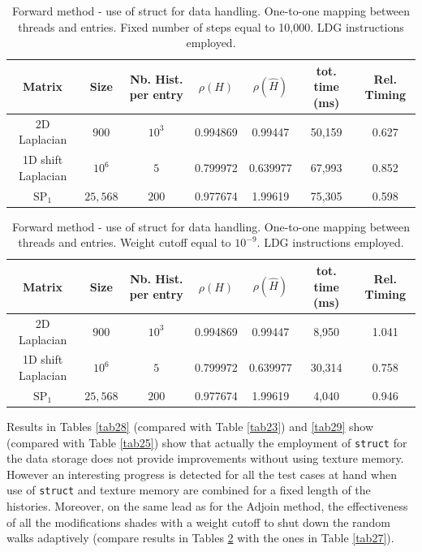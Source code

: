 \documentclass[a4paper,10pt]{article}
\begin{document}
\begin{table}[!h]
\hspace*{-1cm}
\begin{tabular}{|c|c|c|c|c|c|c|}
\hline
\textbf{Matrix} & \textbf{Size} &\textbf{Nb. Hist. per entry} & $\rho(H)$ 
& $\rho(\hat{H})$ & tot. time (ms) & Rel. Timing\\
\hline
2D Laplacian& $900$ & $10^3$ & 0.994869 & 0.99447 & 50,159 & 0.627\\
\hline 
1D shift Laplacian& $10^6$ & $5$ & 0.799972 & 0.639977 & 67,993 & 0.852\\
\hline
$\text{SP}_1$ & $25,568$ & $200$ & 0.977674 & 1.99619 & 75,305 & 0.598\\
\hline
\end{tabular}
\caption{Forward method - use of struct for data handling. One-to-one mapping 
between threads and entries. 
Fixed number of steps equal to 10,000. LDG instructions employed.}
\label{tab30}
\end{table}


\begin{table}[!h]
\hspace*{-1cm}
\begin{tabular}{|c|c|c|c|c|c|c|}
\hline
\textbf{Matrix} & \textbf{Size} &\textbf{Nb. Hist. per entry} & $\rho(H)$ 
& $\rho(\hat{H})$ & tot. time (ms) & Rel. Timing\\
\hline
2D Laplacian& $900$ & $10^3$ & 0.994869 & 0.99447 & 8,950 & 1.041\\
\hline 
1D shift Laplacian& $10^6$ & $5$ & 0.799972 & 0.639977 & 30,314 & 0.758\\
\hline
$\text{SP}_1$ & $25,568$ & $200$ & 0.977674 & 1.99619 & 4,040 & 0.946\\
\hline
\end{tabular}
\caption{Forward method - use of struct for data handling. One-to-one mapping 
between threads and entries. 
Weight cutoff equal to $10^{-9}$. LDG instructions employed.}
\label{tab31}
\end{table}

Results in Tables \ref{tab28} (compared with Table \ref{tab23}) and \ref{tab29} 
show (compared with Table \ref{tab25}) show
that actually the employment of \texttt{struct} for the data storage does not 
provide 
improvements without using texture memory. However an 
interesting progress is detected for all the test cases at hand when use of 
\texttt{struct} and texture memory are combined for a fixed length of the 
histories. Moreover, on the same lead as for the Adjoin method, the 
effectiveness of all the modifications shades with a weight cutoff to shut down 
the random walks adaptively (compare results in Tables \ref{tab31} with the 
ones in Table \ref{tab27}).
\end{document}

